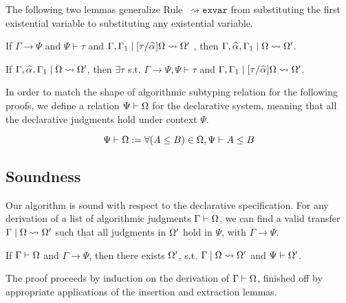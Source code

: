 The following two lemmas generalize Rule~$\mathtt{{\rightsquigarrow}exvar}$ from substituting the first
existential variable to substituting any existential variable.

\begin{lemma}[Insert]
If $\Gamma\to\Psi$ and $\Psi\vdash \tau$ and $\Gamma, \Gamma_1 \mid [\tau/\al]\exps \rightsquigarrow \exps'$
, then $\Gamma, \al, \Gamma_1\mid \exps \rightsquigarrow \exps'$.
\end{lemma}
\begin{lemma}[Extract]
	If $\Gamma, \al, \Gamma_1\mid \exps \rightsquigarrow \exps'$, then $\exists\tau$ s.t. $\Gamma\to\Psi, \Psi\vdash \tau$ and $\Gamma, \Gamma_1 \mid [\tau/\al]\exps \rightsquigarrow \exps'$.
\end{lemma}

In order to match the shape of algorithmic subtyping relation for the following proofs, we define a relation $\Psi\vdash \Omega$ for the declarative system, meaning that all the declarative judgments hold under context $\Psi$.
\begin{definition}
	$$\Psi\vdash\Omega := \forall (A\le B)\in \Omega, \Psi\vdash A\le B$$
\end{definition}


\subsection{Soundness}
Our algorithm is sound with respect to the
declarative specification. For any derivation of a list of algorithmic
judgments $\Gamma\vdash\Omega$, we can find a valid transfer
$\Gamma\mid\Omega\rightsquigarrow\Omega'$ such that all judgments in $\Omega'$ hold
in $\Psi$, with $\Gamma \to \Psi$.

\begin{theorem}[Soundness]
	If $\Gamma\vdash \Omega$ and $\Gamma \to \Psi$, then there exists $\Omega'$, s.t. $\Gamma \mid \Omega\rightsquigarrow \Omega'$ and $\Psi\vdash \Omega'$.
\end{theorem}
The proof proceeds by induction on the derivation
of $\Gamma\vdash\Omega$, finished off by appropriate applications of the insertion and
extraction lemmas.

